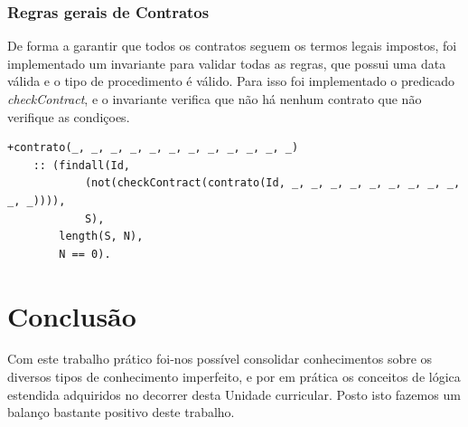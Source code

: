 \documentclass[a4paper]{report}
\begin{document}
\subsection{Regras gerais de Contratos}

De forma a garantir que todos os contratos seguem os termos legais impostos, foi
implementado um invariante para validar todas as regras, que possui uma data
válida e o tipo de procedimento é válido. Para isso foi implementado o predicado
\textit{checkContract}, e o invariante verifica que não há nenhum contrato que
não verifique as condiçoes.

\begin{verbatim}
+contrato(_, _, _, _, _, _, _, _, _, _, _, _) 
    :: (findall(Id, 
            (not(checkContract(contrato(Id, _, _, _, _, _, _, _, _, _, _, _)))),
            S),
        length(S, N),
        N == 0).
\end{verbatim}

\chapter{Conclusão}

Com este trabalho prático foi-nos possível consolidar conhecimentos sobre os
diversos tipos de conhecimento imperfeito, e por em prática os conceitos de
lógica estendida adquiridos no decorrer desta Unidade curricular. Posto isto
fazemos um balanço bastante positivo deste trabalho.
\end{document}
